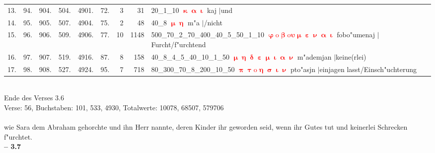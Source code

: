 \documentclass[a4paper,10pt,landscape]{article}
\begin{document}
\begin{tabular}{rrrrrrrrp{120mm}}
13.&94.&904.&504.&4901.&72.&3&31&20\_1\_10 \textcolor{red}{$\boldsymbol{\upkappa\upalpha\upiota}$} kaj $|$und\\
14.&95.&905.&507.&4904.&75.&2&48&40\_8 \textcolor{red}{$\boldsymbol{\upmu\upeta}$} m"a $|$/nicht\\
15.&96.&906.&509.&4906.&77.&10&1148&500\_70\_2\_70\_400\_40\_5\_50\_1\_10 \textcolor{red}{$\boldsymbol{\upvarphi\mathrm{o}\upbeta\mathrm{o}\upsilon\upmu\upepsilon\upnu\upalpha\upiota}$} fobo"umenaj $|$Furcht/f"urchtend\\
16.&97.&907.&519.&4916.&87.&8&158&40\_8\_4\_5\_40\_10\_1\_50 \textcolor{red}{$\boldsymbol{\upmu\upeta\updelta\upepsilon\upmu\upiota\upalpha\upnu}$} m"ademjan $|$keine(rlei)\\
17.&98.&908.&527.&4924.&95.&7&718&80\_300\_70\_8\_200\_10\_50 \textcolor{red}{$\boldsymbol{\uppi\uptau\mathrm{o}\upeta\upsigma\upiota\upnu}$} pto"asjn $|$einjagen lasst/Einsch"uchterung\\
\end{tabular}\medskip \\
Ende des Verses 3.6\\
Verse: 56, Buchstaben: 101, 533, 4930, Totalwerte: 10078, 68507, 579706\\
\\
wie Sara dem Abraham gehorchte und ihn Herr nannte, deren Kinder ihr geworden seid, wenn ihr Gutes tut und keinerlei Schrecken f"urchtet.\\
\newpage 
{\bf -- 3.7}\\
\medskip \\
\end{document}

